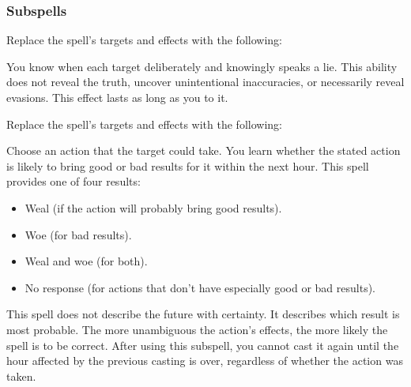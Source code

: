 \subsubsection{Subspells}
Replace the spell's targets and effects with the following:
\begin{spellcontent}
\begin{augmenttargetinginfo}
\end{augmenttargetinginfo}
\begin{augmenteffects}
\spelleffect
You know when each target deliberately and knowingly speaks a lie.
This ability does not reveal the truth, uncover unintentional inaccuracies, or necessarily reveal evasions.
This effect lasts as long as you  to it.
\end{augmenteffects}
\end{spellcontent}
Replace the spell's targets and effects with the following:
\begin{spellcontent}
\begin{augmenttargetinginfo}
\end{augmenttargetinginfo}
\begin{augmenteffects}
\spelleffect
Choose an action that the target could take.
You learn whether the stated action is likely to bring good or bad results for it within the next hour.
This spell provides one of four results:
\begin{itemize}
\item Weal (if the action will probably bring good results).
\item Woe (for bad results).
\item Weal and woe (for both).
\item No response (for actions that don't have especially good or bad results).
\end{itemize}
This spell does not describe the future with certainty.
It describes which result is most probable.
The more unambiguous the action's effects, the more likely the spell is to be correct.
After using this subspell, you cannot cast it again until the hour affected by the previous casting is over, regardless of whether the action was taken.
\end{augmenteffects}
\end{spellcontent}
